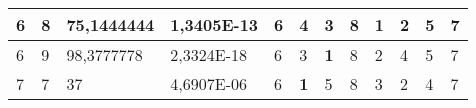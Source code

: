 \documentclass[conference]{IEEEtran}
\begin{document}
\begin{table*}[]
\begin{tabular}{|llll|llllllll|}
\multicolumn{1}{|l|}{6}                                                     & \multicolumn{1}{l|}{8}                                                        & \multicolumn{1}{l|}{75,1444444}                                                   & 1,3405E-13                     & \multicolumn{1}{l|}{6}                                                  & \multicolumn{1}{l|}{4}                                                  & \multicolumn{1}{l|}{3}                                                  & \multicolumn{1}{l|}{8}                                                  & \multicolumn{1}{l|}{\textbf{1}}                                         & \multicolumn{1}{l|}{2}                                                  & \multicolumn{1}{l|}{5}                                                  & 7                          \\ \hline
\multicolumn{1}{|l|}{6}                                                     & \multicolumn{1}{l|}{9}                                                        & \multicolumn{1}{l|}{98,3777778}                                                   & 2,3324E-18                     & \multicolumn{1}{l|}{6}                                                  & \multicolumn{1}{l|}{3}                                                  & \multicolumn{1}{l|}{\textbf{1}}                                         & \multicolumn{1}{l|}{8}                                                  & \multicolumn{1}{l|}{2}                                                  & \multicolumn{1}{l|}{4}                                                  & \multicolumn{1}{l|}{5}                                                  & 7                          \\ \hline
\multicolumn{1}{|l|}{7}                                                     & \multicolumn{1}{l|}{7}                                                        & \multicolumn{1}{l|}{37}                                                           & 4,6907E-06                     & \multicolumn{1}{l|}{6}                                                  & \multicolumn{1}{l|}{\textbf{1}}                                         & \multicolumn{1}{l|}{5}                                                  & \multicolumn{1}{l|}{8}                                                  & \multicolumn{1}{l|}{3}                                                  & \multicolumn{1}{l|}{2}                                                  & \multicolumn{1}{l|}{4}                                                  & 7                          \\ \hline

\end{tabular}
\end{table*}
\end{document}
